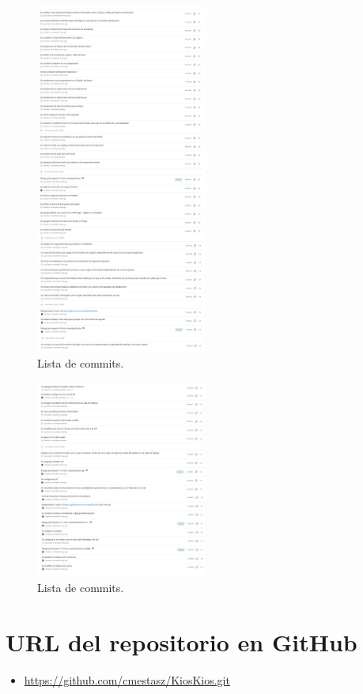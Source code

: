 \documentclass{article}
\begin{document}
\pagebreak
\begin{figure}[H]
	\centering
	\includegraphics[width=0.5\textwidth,keepaspectratio]{img/commits3.png}
	\caption{Lista de commits.}
\end{figure}
\pagebreak
\begin{figure}[H]
	\centering
	\includegraphics[width=0.5\textwidth,keepaspectratio]{img/commits4.png}
	\caption{Lista de commits.}
\end{figure}
\pagebreak

\section{URL del repositorio en GitHub}
\begin{itemize}
	\item \url{https://github.com/cmestasz/KiosKios.git}
\end{itemize}
\end{document}
